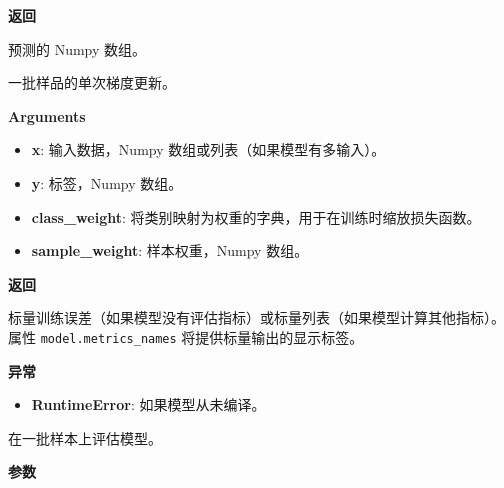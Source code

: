 \textbf{返回}

预测的 Numpy 数组。



\label{trainux5fonux5fbatch}

\begin{Shaded}
\begin{Highlighting}[]
\OperatorTok{=}\OperatorTok{=}\NormalTok{)}
\end{Highlighting}
\end{Shaded}

一批样品的单次梯度更新。

\textbf{Arguments}

\begin{itemize}
\tightlist
\item
  \textbf{x}: 输入数据，Numpy 数组或列表（如果模型有多输入）。
\item
  \textbf{y}: 标签，Numpy 数组。
\item
  \textbf{class\_weight}:
  将类别映射为权重的字典，用于在训练时缩放损失函数。
\item
  \textbf{sample\_weight}: 样本权重，Numpy 数组。
\end{itemize}

\textbf{返回}

标量训练误差（如果模型没有评估指标）或标量列表（如果模型计算其他指标）。
属性 \texttt{model.metrics\_names} 将提供标量输出的显示标签。

\textbf{异常}

\begin{itemize}
\tightlist
\item
  \textbf{RuntimeError}: 如果模型从未编译。
\end{itemize}



\label{testux5fonux5fbatch}

\begin{Shaded}
\begin{Highlighting}[]
\OperatorTok{=}\NormalTok{)}
\end{Highlighting}
\end{Shaded}

在一批样本上评估模型。

\textbf{参数}

